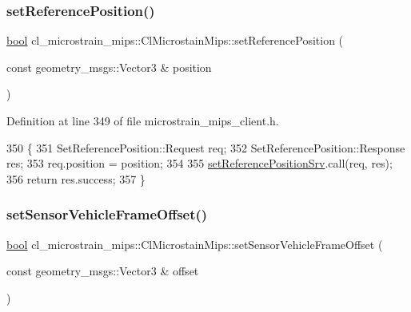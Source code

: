 \subsubsection{\texorpdfstring{set\+Reference\+Position()}{setReferencePosition()}}
{\footnotesize\ttfamily \hyperlink{classbool}{bool} cl\+\_\+microstrain\+\_\+mips\+::\+Cl\+Microstain\+Mips\+::set\+Reference\+Position (\begin{DoxyParamCaption}\item[{const geometry\+\_\+msgs\+::\+Vector3 \&}]{position }\end{DoxyParamCaption})\hspace{0.3cm}{\ttfamily [inline]}}



Definition at line 349 of file microstrain\+\_\+mips\+\_\+client.\+h.


\begin{DoxyCode}
350     \{
351         SetReferencePosition::Request req;
352         SetReferencePosition::Response res;
353         req.position = position;
354 
355         \hyperlink{classcl__microstrain__mips_1_1ClMicrostainMips_a778117029f93a6cff9c5e2a0dac9742b}{setReferencePositionSrv}.call(req, res);
356         \textcolor{keywordflow}{return} res.success;
357     \}
\end{DoxyCode}
\mbox{\label{classcl__microstrain__mips_1_1ClMicrostainMips_a2b2786c142088f7d8e0fba6fc67d3a88}} 
\subsubsection{\texorpdfstring{set\+Sensor\+Vehicle\+Frame\+Offset()}{setSensorVehicleFrameOffset()}}
{\footnotesize\ttfamily \hyperlink{classbool}{bool} cl\+\_\+microstrain\+\_\+mips\+::\+Cl\+Microstain\+Mips\+::set\+Sensor\+Vehicle\+Frame\+Offset (\begin{DoxyParamCaption}\item[{const geometry\+\_\+msgs\+::\+Vector3 \&}]{offset }\end{DoxyParamCaption})\hspace{0.3cm}{\ttfamily [inline]}}



